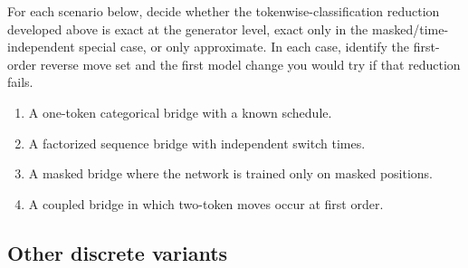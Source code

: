 \documentclass[11pt]{article}
\newif\ifshowsolutions
\newcommand{\SolutionBox}[2][10]{%
  \ifshowsolutions
    \begin{tcolorbox}[stat221panelgray,title={Solution}]
    #2
    \end{tcolorbox}
  \else
    \begin{tcolorbox}[stat221panelgray,unbreakable,title={Workspace}]
    \vspace{#1\baselineskip}
    \end{tcolorbox}
  \fi
}
\begin{document}
\begin{exercise}
\label{ex:classify-the-bridge}
For each scenario below, decide whether the tokenwise-classification reduction developed above is exact at the generator level, exact only in the masked/time-independent special case, or only approximate.
In each case, identify the first-order reverse move set and the first model change you would try if that reduction fails.
\begin{enumerate}[leftmargin=*]
  \item A one-token categorical bridge with a known schedule.
  \item A factorized sequence bridge with independent switch times.
  \item A masked bridge where the network is trained only on masked positions.
  \item A coupled bridge in which two-token moves occur at first order.
\end{enumerate}
\end{exercise}
\SolutionBox[14]{For the one-token categorical bridge, classification is exact at the generator level:
the reverse chain can jump from the current token \(x\) to any token \(v\neq x\), and the rates are exactly the posterior coordinates \(q_{0\mid t}(X_0=v\mid X_t=x)\).
For the factorized sequence bridge, classification is again exact at the generator level:
the first-order move set consists of one-token neighbors \(x^{j\to v}\), and the corresponding rates are exactly the coordinate marginals \(q_{0\mid t}(X_{0,j}=v\mid X_t=x)\).
For the masked bridge, this is the masked/time-independent special case of the factorized bridge, so the reduction remains exact at the generator level:
the uncertain moves live only on masked coordinates, the posterior ignores \(t\), and training can therefore be restricted to masked positions whose posteriors are not already degenerate.
For a coupled bridge with two-token moves at first order, classification is only approximate.
The reverse generator now needs block moves or other nonlocal jumps, so a tokenwise classifier is missing the first-order object itself.
The first fix is to enlarge the learned reverse object, for example by modeling blockwise posteriors or a richer reverse kernel that can score coupled edits.}

\subsection{Other discrete variants}
\label{subsec:other-discrete-variants}
\end{document}
